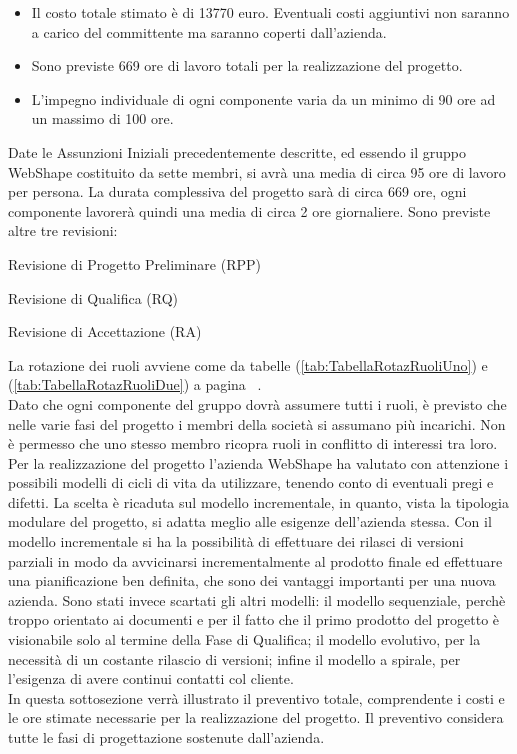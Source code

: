 \begin{itemize}
\item Il costo totale stimato \`e di 13770 euro. Eventuali costi aggiuntivi non saranno a carico del committente ma saranno coperti dall'azienda.
\item Sono previste 669 ore di lavoro totali per la realizzazione del progetto.
\item L'impegno individuale di ogni componente varia da un minimo di 90 ore ad un massimo di 100 ore.
\end{itemize}


Date le Assunzioni Iniziali precedentemente descritte, ed essendo il gruppo WebShape costituito da sette membri, si avr\`a una media di circa 95 ore di lavoro per persona. La durata complessiva del progetto sar\`a di circa 669 ore, ogni componente lavorer\`a quindi una media di circa 2 ore giornaliere. Sono previste altre tre revisioni:
\begin{elenconumerato}{\normindent}
				\item Revisione di Progetto Preliminare (RPP)
				\item Revisione di Qualifica (RQ)
				\item Revisione di Accettazione (RA)
			\end{elenconumerato}

La rotazione dei ruoli avviene come da tabelle (\ref{tab:TabellaRotazRuoliUno}) e (\ref{tab:TabellaRotazRuoliDue}) a pagina ~\pageref{tab:TabellaRotazRuoliUno}.\\
Dato che ogni componente del gruppo dovr\`a assumere tutti i ruoli, \`e previsto che nelle varie fasi del progetto i membri della societ\`a si assumano pi\`u incarichi. Non \`e permesso che uno stesso membro ricopra ruoli in conflitto di interessi tra loro.\\

Per la realizzazione del progetto l'azienda WebShape ha valutato con attenzione i possibili modelli di cicli di vita da utilizzare, tenendo conto di eventuali pregi e difetti. 
La scelta \`e ricaduta sul modello incrementale, in quanto, vista la tipologia modulare del progetto, si adatta meglio alle esigenze dell'azienda stessa. Con il modello incrementale si ha la possibilit\`a di effettuare dei rilasci di versioni parziali in modo da avvicinarsi incrementalmente al prodotto finale ed effettuare una pianificazione ben definita, che sono dei vantaggi importanti per una nuova azienda. Sono stati invece scartati gli altri modelli: il modello sequenziale, perch\`e troppo orientato ai documenti e per il fatto che il primo prodotto del progetto \`e visionabile solo al termine della Fase di Qualifica; il modello evolutivo, per la necessit\`a di un costante rilascio di versioni; infine il modello a spirale, per l'esigenza di avere continui contatti col cliente.\\
In questa sottosezione verr\`a illustrato il preventivo totale, comprendente i costi e le ore stimate necessarie per la realizzazione del progetto. Il preventivo considera tutte le fasi di progettazione sostenute dall'azienda.

